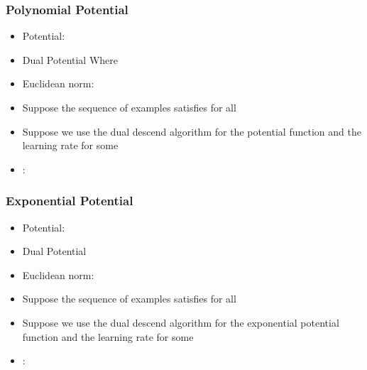 \documentclass{beamer}
\begin{document}
\begin{frame}
  \frametitle{Polynomial Potential}
  \begin{itemize}
  \item Potential: 
  \item Dual Potential  Where
  \item Euclidean norm: 
  \item Suppose the sequence of examples
     satisfies  for all 
  \item Suppose we use the dual descend algorithm for the potential
    function  and the learning rate  for some 
  \item {}:\\
  \end{itemize}
\end{frame}

\begin{frame}
\frametitle{Exponential Potential}
  \begin{itemize}
  \item Potential: 
  \item Dual Potential 
  \item Euclidean norm: 
  \item Suppose the sequence of examples
     satisfies  for all 
  \item Suppose we use the dual descend algorithm for the exponential potential
    function \R{$\Phi$} and the learning rate   for some 
  \item {}:\\
  \end{itemize}
\end{frame}
\end{document}
